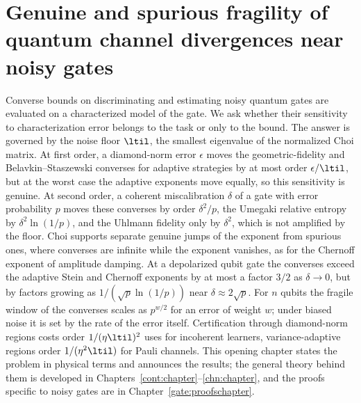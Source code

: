 \chapter{Genuine and spurious fragility of quantum channel divergences near noisy gates}\label{gate:chapter}
\begingroup
{}
\chapmacro{\lmin}{\lambda_{\min}}
\chapmacro{\lmax}{\lambda_{\max}}
\chapmacro{\ltil}{\tilde\lambda}

\begin{chaptersummary}
Converse bounds on discriminating and estimating noisy quantum gates are evaluated on a characterized model of the gate. We ask whether their sensitivity to characterization error belongs to the task or only to the bound. The answer is governed by the noise floor $\ltil$, the smallest eigenvalue of the normalized Choi matrix. At first order, a diamond-norm error $\epsilon$ moves the geometric-fidelity and Belavkin--Staszewski converses for adaptive strategies by at most order $\epsilon/\ltil$, but at the worst case the adaptive exponents move equally, so this sensitivity is genuine. At second order, a coherent miscalibration $\delta$ of a gate with error probability $p$ moves these converses by order $\delta^2/p$, the Umegaki relative entropy by $\delta^2\ln(1/p)$, and the Uhlmann fidelity only by $\delta^2$, which is not amplified by the floor. Choi supports separate genuine jumps of the exponent from spurious ones, where converses are infinite while the exponent vanishes, as for the Chernoff exponent of amplitude damping. At a depolarized qubit gate the converses exceed the adaptive Stein and Chernoff exponents by at most a factor $3/2$ as $\delta\to0$, but by factors growing as $1/(\sqrt p\ln(1/p))$ near $\delta\approx2\sqrt p$. For $n$ qubits the fragile window of the converses scales as $p^{w/2}$ for an error of weight $w$; under biased noise it is set by the rate of the error itself. Certification through diamond-norm regions costs order $1/(\eta\ltil)^2$ uses for incoherent learners, variance-adaptive regions order $1/(\eta^2\ltil)$ for Pauli channels.
This opening chapter states the problem in physical terms and announces the results; the general theory behind them is developed in Chapters~\ref{cont:chapter}--\ref{chn:chapter}, and the proofs specific to noisy gates are in Chapter~\ref{gate:proofschapter}.
\end{chaptersummary}

